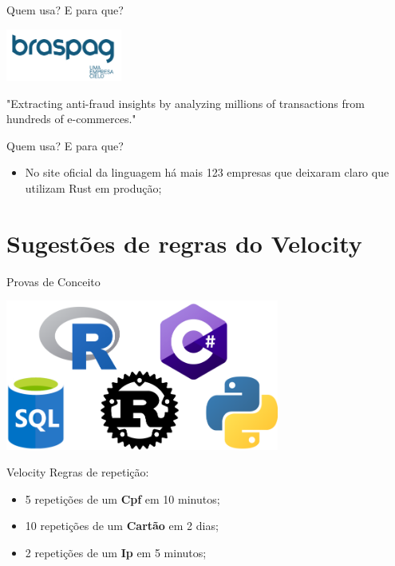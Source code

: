 \documentclass[aspectratio=169]{beamer}
\begin{document}
\begin{frame}{Quem usa? E para que?}
	\begin{center}
		\includegraphics[width=3.8cm]{imgs/logo.png}	
		
		"Extracting anti-fraud insights by analyzing millions of transactions from hundreds of e-commerces."
	\end{center}
\end{frame}

\begin{frame}{Quem usa? E para que?}
	\begin{itemize}
		\item No site oficial da linguagem há mais 123 empresas que deixaram claro que utilizam Rust em produção;
	\end{itemize}
\end{frame}

\section{Sugestões de regras do Velocity}

\begin{frame}{Provas de Conceito}
	\begin{center}
		\includegraphics[width=9.0cm]{imgs/battle.png}	
	\end{center}
\end{frame}


\begin{frame}{Velocity}
	Regras de repetição:
	\begin{itemize}
		\item 5 repetições de um \textbf{Cpf} em 10 minutos;
		\item 10 repetições de um \textbf{Cartão} em 2 dias;
		\item 2 repetições de um \textbf{Ip} em 5 minutos;
	\end{itemize}

	\begin{chronology}[5]{1}{10}{80ex}[\textwidth]
	\end{chronology}
\end{frame}
\end{document}
